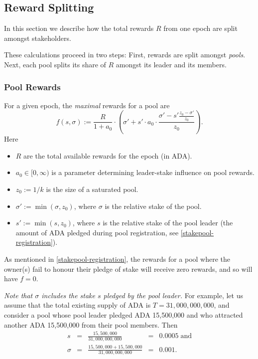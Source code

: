 \documentclass[11pt,a4paper]{article}
\begin{document}
\subsection{Reward Splitting}
\label{reward-splitting}

In this section we describe how the total rewards \(R\) from one epoch
are split amongst stakeholders.

These calculations proceed in two steps: First, rewards are split
amongst \emph{pools}. Next, each pool splits its share of \(R\) amongst
its leader and its members.

\subsubsection{Pool Rewards}
\label{pool-rewards}

For a given epoch, the \emph{maximal} rewards for a pool are \[
    f(s,\sigma) :=
    \frac{R}{1 + a_0}
    \cdot
    \left(\sigma' + s'\cdot a_0\cdot\frac{\sigma' - s'\frac{z_0-\sigma'}{z_0}}{z_0}\right).
\] Here

\begin{itemize}
\item
  \(R\) are the total available rewards for the epoch (in ADA).
\item
  \(a_0\in[0,\infty)\) is a parameter determining leader-stake influence
  on pool rewards.
\item
  \(z_0:=1/k\) is the size of a saturated pool.
\item
  \(\sigma':=\min(\sigma, z_0)\), where \(\sigma\) is the relative stake
  of the pool.
\item
  \(s':=\min(s, z_0)\), where \(s\) is the relative stake of the pool
  leader (the amount of ADA pledged during pool registration,
  see \cref{stakepool-registration}).
\end{itemize}

As mentioned in \cref{stakepool-registration}, the rewards for a pool
where the owner(s) fail to honour their pledge of stake will receive
zero rewards, and so will have $f=0$.

\emph{Note that \(\sigma\) includes the stake \(s\) pledged by the pool
leader.} For example, let us assume that the total existing supply of
ADA is \(T=31,000,000,000\), and consider a pool whose pool leader
pledged ADA 15,500,000 and who attracted another ADA 15,500,000 from their
pool members. Then \[
\begin{array}{rcccl}
    s                  & = & \displaystyle\frac{15,500,000}{31,000,000,000}              & = & 0.0005\;\text{and} \\[5mm]
    \sigma & = & \displaystyle\frac{15,500,000 + 15,500,000}{31,000,000,000} & = & 0.001. \\
\end{array}
\]
\end{document}
